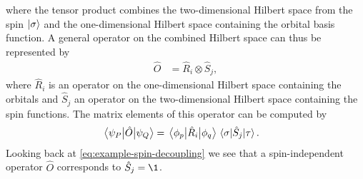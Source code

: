         where the tensor product combines the two-dimensional Hilbert space from
        the spin $\ket{\sigma}$ and the one-dimensional Hilbert space containing
        the orbital basis function.
        A general operator on the combined Hilbert space can thus be represented
        by
        \begin{align}
            \hat{O}
            &= \hat{R}_i \otimes \hat{S}_j,
        \end{align}
        where $\hat{R}_i$ is an operator on the one-dimensional Hilbert space
        containing the orbitals and $\hat{S}_j$ an operator on the
        two-dimensional Hilbert space containing the spin functions.
        The matrix elements of this operator can be computed by
        \begin{align}
            \mel{\psi_{P}}{\hat{O}}{\psi_{Q}}
            &=
            \mel{\phi_p}{\hat{R}_i}{\phi_q}
            \mel{\sigma}{\hat{S}_j}{\tau}.
        \end{align}
        Looking back at \autoref{eq:example-spin-decoupling} we see that a
        spin-independent operator $\hat{O}$ corresponds to $\hat{S}_j = \1$.

